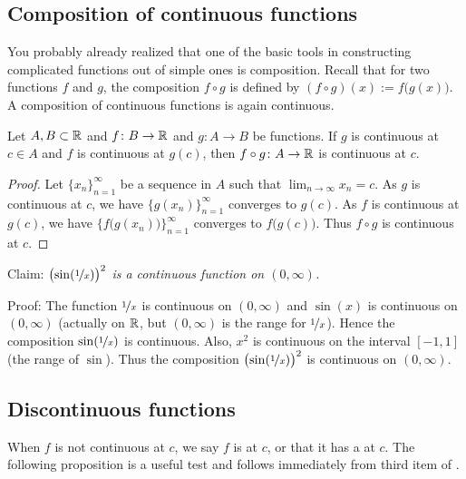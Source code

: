 \subsection{Composition of continuous functions}

You probably already realized that one of the basic tools in
constructing complicated functions out of simple ones is composition.
Recall that for two functions $f$ and $g$,
the composition $f \circ g$ is defined by
$(f \circ g)(x) := f\bigl(g(x)\bigr)$.
A composition of
continuous functions is again
continuous.

\begin{prop} \label{prop:compositioncont}
Let $A, B \subset {\mathbb{R}}$ and $f \colon B \to {\mathbb{R}}$ and $g \colon A \to B$ be
functions.  If $g$ is continuous at $c \in A$ and
$f$ is continuous at $g(c)$, then $f \circ g \colon A \to {\mathbb{R}}$ is continuous
at $c$.
\end{prop}

\begin{proof}
Let $\{ x_n \}_{n=1}^\infty$ be a sequence in $A$ such that
$\lim_{n\to\infty} x_n = c$.
As $g$ is continuous at $c$, we have $\bigl\{ g(x_n) \bigr\}_{n=1}^\infty$ converges to $g(c)$.
As $f$ is continuous at $g(c)$, we have $\bigl\{ f\bigl(g(x_n)\bigr)
\bigr\}_{n=1}^\infty$ converges
to $f\bigl(g(c)\bigr)$.
Thus $f \circ g$ is continuous at $c$.
\end{proof}

\begin{example}
Claim: \emph{${\bigl(\sin(\nicefrac{1}{x})\bigr)}^2$ is a continuous
function on $(0,\infty)$.}

Proof: The function $\nicefrac{1}{x}$ is continuous on
$(0,\infty)$ and $\sin(x)$ is continuous on $(0,\infty)$ (actually
on ${\mathbb{R}}$, but $(0,\infty)$ is the range for $\nicefrac{1}{x}$).
Hence the composition $\sin(\nicefrac{1}{x})$ is continuous.  Also,
$x^2$ is continuous on the interval $[-1,1]$ (the range of $\sin$).  Thus
the composition
${\bigl(\sin(\nicefrac{1}{x})\bigr)}^2$ is continuous on $(0,\infty)$.
\end{example}

\subsection{Discontinuous functions}

When $f$ is not continuous at $c$, we
say $f$ is \emph{} at $c$, or that it has a
\emph{} at $c$.
The following proposition is a useful test and follows immediately
from third item of .


